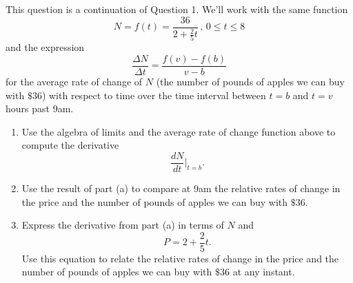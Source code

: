 \documentclass{ximera}
\begin{document}
\begin{question} \label{Q09fdfgsgg}
This question is a continuation of Question 1. We'll work with the same function
\[
     N = f(t) = \frac{36}{2 + \frac{2}{5}t} \, , \, 0\leq t \leq 8
\]
and the expression
\[
 \frac{\Delta N}{\Delta t} = \frac{f(v)-f(b)}{v-b}
\]
for the average rate of change of $N$ (the number of pounds of apples we can buy with $\$36$) with respect to time over the time interval between $t=b$ and $t=v$ hours past 9am.

\begin{enumerate}
\item Use the algebra of limits and the average rate of change function above to compute the derivative
\[
  \frac{dN}{dt}\Big|_{t=b} .
\]

\item Use the result of part (a) to compare at 9am the relative rates of change in the price and the number of pounds of apples we can buy with $\$36$. 

\item Express the derivative from part (a) in terms of $N$ and 
\[
  P = 2+ \frac{2}{5}t.
\] 
Use this equation to relate the relative rates of change in the price and the number of pounds of apples we can buy with $\$36$ at any instant. 


\end{enumerate}
\end{question}
\end{document}
